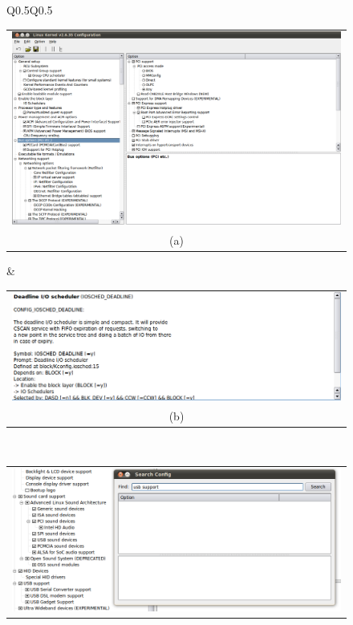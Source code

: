 \documentclass{chi2009}
\begin{document}
\begin{figure}[!t]
 \centering
 \begin{tabular}[textwidth]{Q{0.5\textwidth}Q{0.5\textwidth}}
 \begin{tabular}{c}
  \includegraphics[scale=0.25,keepaspectratio=true]{figs/xconfigmenu} \\
  (a) \\
 \end{tabular}
  & 
\begin{tabular}{c}
  \includegraphics[scale=0.3,keepaspectratio=true]{figs/xconfigoption} \\
  (b) \\
 \end{tabular} \\
 \begin{tabular}{c}
  \includegraphics[scale=0.25,keepaspectratio=true]{figs/xconfigsearch} \\

\end{tabular}
\end{tabular}
\end{figure}
\end{document}
